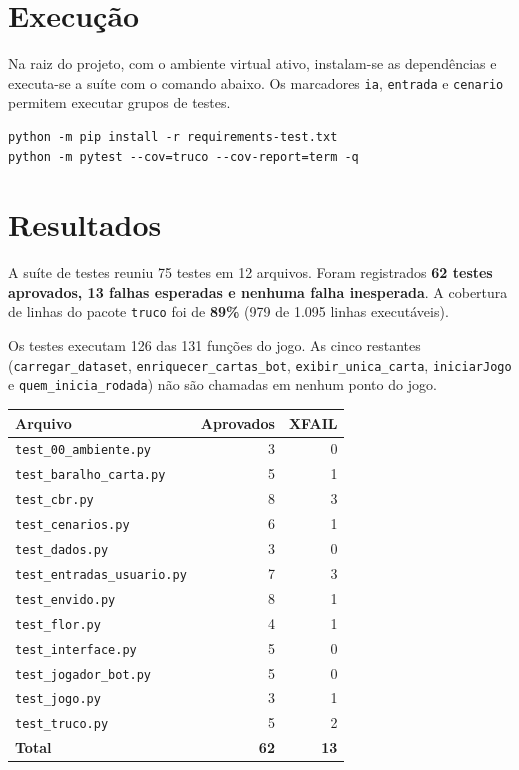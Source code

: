 \documentclass[11pt,a4paper]{article}
\begin{document}
\section{Execução}

Na raiz do projeto, com o ambiente virtual ativo, instalam-se as dependências e executa-se a suíte com o comando abaixo. Os marcadores \texttt{ia}, \texttt{entrada} e \texttt{cenario} permitem executar grupos de testes.

\begin{verbatim}
python -m pip install -r requirements-test.txt
python -m pytest --cov=truco --cov-report=term -q
\end{verbatim}

\section{Resultados}

A suíte de testes reuniu 75 testes em 12 arquivos. Foram registrados \textbf{62 testes aprovados, 13 falhas esperadas e nenhuma falha inesperada}. A cobertura de linhas do pacote \texttt{truco} foi de \textbf{89\%} (979 de 1.095 linhas executáveis).

Os testes executam 126 das 131 funções do jogo. As cinco restantes (\texttt{carregar\_dataset}, \texttt{enriquecer\_cartas\_bot}, \texttt{exibir\_unica\_carta}, \texttt{iniciarJogo} e \texttt{quem\_inicia\_rodada}) não são chamadas em nenhum ponto do jogo.

\begin{tabularx}{\textwidth}{Lrr}
\toprule
{}\textbf{Arquivo} & \textbf{Aprovados} & \textbf{XFAIL} \\
\midrule
\texttt{test\_00\_ambiente.py} & 3 & 0 \\
\texttt{test\_baralho\_carta.py} & 5 & 1 \\
\texttt{test\_cbr.py} & 8 & 3 \\
\texttt{test\_cenarios.py} & 6 & 1 \\
\texttt{test\_dados.py} & 3 & 0 \\
\texttt{test\_entradas\_usuario.py} & 7 & 3 \\
\texttt{test\_envido.py} & 8 & 1 \\
\texttt{test\_flor.py} & 4 & 1 \\
\texttt{test\_interface.py} & 5 & 0 \\
\texttt{test\_jogador\_bot.py} & 5 & 0 \\
\texttt{test\_jogo.py} & 3 & 1 \\
\texttt{test\_truco.py} & 5 & 2 \\
\midrule
{}\textbf{Total} & \textbf{62} & \textbf{13} \\
\bottomrule
\end{tabularx}
\end{document}
